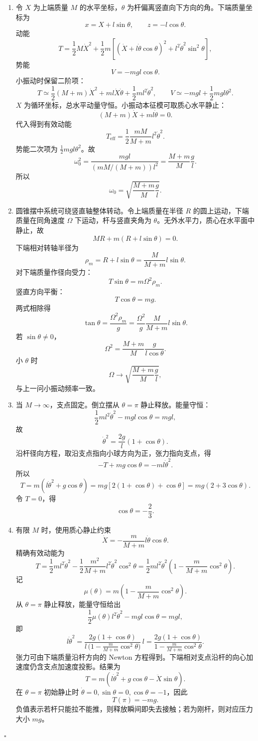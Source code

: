\documentclass[UTF8,12pt]{ctexart}
\newenvironment{solution}{%
  \par\medskip
  \noindent{\bfseries 解答}\quad\ignorespaces
}{\hfill$\square$\par\medskip}
\begin{document}
\begin{solution}
\begin{enumerate}[label=(\arabic*)]
\item 令 \(X\) 为上端质量 \(M\) 的水平坐标，\(\theta\) 为杆偏离竖直向下方向的角。下端质量坐标为
\[
x=X+l\sin\theta,\qquad z=-l\cos\theta.
\]
动能
\[
T=\frac12M\dot X^2+\frac12m\left[(\dot X+l\dot\theta\cos\theta)^2
+l^2\dot\theta^2\sin^2\theta\right],
\]
势能
\[
V=-mgl\cos\theta.
\]
小振动时保留二阶项：
\[
T\simeq \frac12(M+m)\dot X^2+ml\dot X\dot\theta+\frac12ml^2\dot\theta^2,
\qquad
V\simeq -mgl+\frac12mgl\theta^2.
\]
\(X\) 为循环坐标，总水平动量守恒。小振动本征模可取质心水平静止：
\[
(M+m)\dot X+ml\dot\theta=0.
\]
代入得到有效动能
\[
T_{\mathrm{eff}}=\frac12\frac{mM}{M+m}l^2\dot\theta^2.
\]
势能二次项为 \(\frac12mgl\theta^2\)。故
\[
\omega_0^2=\frac{mgl}{(mM/(M+m))l^2}
=\frac{M+m}{M}\frac gl.
\]
所以
\[
\omega_0=\sqrt{\frac{M+m}{M}\frac gl}.
\]

\item 圆锥摆中系统可绕竖直轴整体转动。令上端质量在半径 \(R\) 的圆上运动，下端质量在同角速度 \(\Omega\) 下运动，杆与竖直夹角为 \(\theta\)。无外水平力，质心在水平面中静止，故
\[
MR+m(R+l\sin\theta)=0.
\]
下端相对转轴半径为
\[
\rho_m=R+l\sin\theta=\frac{M}{M+m}l\sin\theta.
\]
对下端质量作径向受力：
\[
T\sin\theta=m\Omega^2\rho_m.
\]
竖直方向平衡：
\[
T\cos\theta=mg.
\]
两式相除得
\[
\tan\theta=\frac{\Omega^2\rho_m}{g}
=\frac{\Omega^2}{g}\frac{M}{M+m}l\sin\theta.
\]
若 \(\sin\theta\ne0\)，
\[
\Omega^2=\frac{M+m}{M}\frac{g}{l\cos\theta}.
\]
小 \(\theta\) 时
\[
\Omega\to\sqrt{\frac{M+m}{M}\frac gl},
\]
与上一问小振动频率一致。

\item 当 \(M\to\infty\)，支点固定。倒立摆从 \(\theta=\pi\) 静止释放。能量守恒：
\[
\frac12ml^2\dot\theta^2-mgl\cos\theta=mg l,
\]
故
\[
\dot\theta^2=\frac{2g}{l}(1+\cos\theta).
\]
沿杆径向方程，取沿支点指向小球方向为正，张力指向支点，得
\[
-T+mg\cos\theta=-ml\dot\theta^2.
\]
所以
\[
T=m(l\dot\theta^2+g\cos\theta)
=mg\left[2(1+\cos\theta)+\cos\theta\right]
=mg(2+3\cos\theta).
\]
令 \(T=0\)，得
\[
\cos\theta=-\frac23.
\]

\item 有限 \(M\) 时，使用质心静止约束
\[
\dot X=-\frac{m}{M+m}l\dot\theta\cos\theta.
\]
精确有效动能为
\[
T=\frac12ml^2\dot\theta^2
-\frac12\frac{m^2}{M+m}l^2\dot\theta^2\cos^2\theta
=\frac12ml^2\dot\theta^2
\left(1-\frac{m}{M+m}\cos^2\theta\right).
\]
记
\[
\mu(\theta)=m\left(1-\frac{m}{M+m}\cos^2\theta\right).
\]
从 \(\theta=\pi\) 静止释放，能量守恒给出
\[
\frac12\mu(\theta)l^2\dot\theta^2-mgl\cos\theta=mgl,
\]
即
\[
l\dot\theta^2
=\frac{2g(1+\cos\theta)}
{l\,\bigl(1-\frac{m}{M+m}\cos^2\theta\bigr)}\,l
=\frac{2g(1+\cos\theta)}
{1-\frac{m}{M+m}\cos^2\theta}.
\]
张力可由下端质量沿杆方向的 Newton 方程得到。下端相对支点沿杆的向心加速度仍含支点加速度投影。结果为
\[
T=m\left(l\dot\theta^2+g\cos\theta-\ddot X\sin\theta\right).
\]
在 \(\theta=\pi\) 初始静止时 \(\dot\theta=0,\sin\theta=0,\cos\theta=-1\)，因此
\[
T(\pi)=-mg.
\]
负值表示若杆只能拉不能推，则释放瞬间即失去接触；若为刚杆，则对应压力大小 \(mg\)。


\end{enumerate}
\end{solution}
\end{document}
